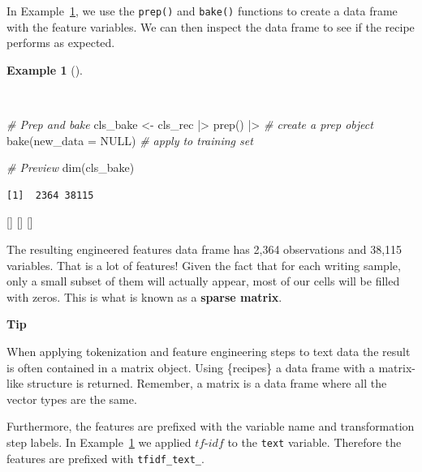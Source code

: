 \documentclass[
  letterpaper,
  krantz1]{latex/krantz-mod}
\newenvironment{Shaded}{\begin{snugshade}}{\end{snugshade}}
\newcommand{\AttributeTok}[1]{\textcolor[rgb]{0.00,0.00,0.00}{#1}}
\newcommand{\CommentTok}[1]{\textcolor[rgb]{0.00,0.00,0.00}{\textit{#1}}}
\newcommand{\ConstantTok}[1]{\textcolor[rgb]{0.00,0.00,0.00}{#1}}
\newcommand{\FunctionTok}[1]{\textcolor[rgb]{0.00,0.00,0.00}{#1}}
\newcommand{\NormalTok}[1]{\textcolor[rgb]{0.00,0.00,0.00}{#1}}
\newcommand{\OtherTok}[1]{\textcolor[rgb]{0.00,0.00,0.00}{#1}}
\newcommand{\SpecialCharTok}[1]{\textcolor[rgb]{0.00,0.00,0.00}{#1}}
\newcommand{\cindex}[1]{%
  \StrSubstitute{#1}{_}{\_}[\temp]%
  \index{\temp}%
}
\theoremstyle{definition}
\theoremstyle{definition}
\newtheorem{example}{Example}[chapter]
\theoremstyle{remark}
\begin{document}
In Example~\ref{exm-predict-class-recipe-prep}, we use the
\texttt{prep()} and \texttt{bake()} functions to create a data frame
with the feature variables. We can then inspect the data frame to see if
the recipe performs as expected.

\begin{example}[]\protect\hypertarget{exm-predict-class-recipe-prep}{}\label{exm-predict-class-recipe-prep}

~

\begin{Shaded}
\begin{Highlighting}[numbers=left,,]
\CommentTok{\# Prep and bake}
\NormalTok{cls\_bake }\OtherTok{\textless{}{-}}
\NormalTok{  cls\_rec }\SpecialCharTok{|\textgreater{}}
  \FunctionTok{prep}\NormalTok{() }\SpecialCharTok{|\textgreater{}} \CommentTok{\# create a prep object}
  \FunctionTok{bake}\NormalTok{(}\AttributeTok{new\_data =} \ConstantTok{NULL}\NormalTok{) }\CommentTok{\# apply to training set}

\CommentTok{\# Preview}
\FunctionTok{dim}\NormalTok{(cls\_bake)}
\end{Highlighting}
\end{Shaded}

\begin{verbatim}
[1]  2364 38115
\end{verbatim}

 \cindex{prep()}\cindex{bake()}\cindex{dim()}

\end{example}

The resulting engineered features data
frame has 2,364 observations and 38,115 variables.
That is a lot of features! Given the fact that for each writing sample,
only a small subset of them will actually appear, most of our cells will
be filled with zeros. This is what is known as a \textbf{sparse
matrix}.

\begin{tcolorbox}[enhanced jigsaw, toprule=.15mm, breakable, colback=white, arc=.35mm, left=2mm, colframe=quarto-callout-color-frame, opacityback=0, bottomrule=.15mm, rightrule=.15mm, leftrule=.75mm]

\textbf{ Tip}

When applying tokenization and feature engineering steps to text data
the result is often contained in a matrix object. Using \{recipes\} a
data frame with a matrix-like structure is returned. Remember, a matrix
is a data frame where all the vector types are the
same.

Furthermore, the features are prefixed with the variable name and
transformation step labels. In
Example~\ref{exm-predict-class-recipe-prep} we applied \(tf\)-\(idf\) to
the \texttt{text} variable. Therefore the features are prefixed with
\texttt{tfidf\_text\_}.

\end{tcolorbox}
\end{document}
